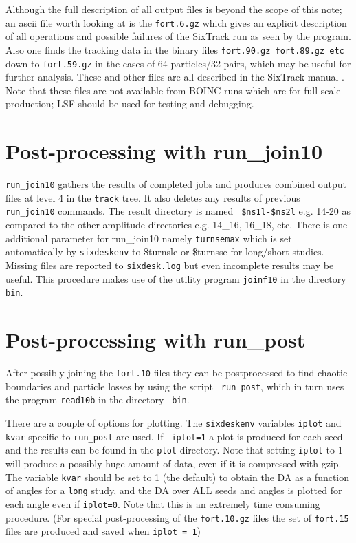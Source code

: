 \documentclass{cernatsnote}
\begin{document}
Although the full description of all output files is beyond the scope of this
note; an ascii file worth looking at is the {\tt fort.6.gz} which gives an
explicit description of all operations and possible failures of the SixTrack
run as seen by the program. Also one finds the tracking data in the binary
files {\tt fort.90.gz fort.89.gz etc} down to {\tt fort.59.gz} in the cases of
64 particles/32 pairs, which may be useful for further analysis. These and
other files are all described in the SixTrack manual \cite{SixTrack}. Note that
these files are not available from BOINC runs which are for full scale
production; LSF should be used for testing and debugging. 

\section{Post-processing with run\_join10}
{\tt run\_join10} gathers the results of completed jobs and produces combined
output files at level 4 in the {\tt track} tree.  It also deletes any results
of previous {\tt run\_join10} commands.  The result directory is named {\tt
\$ns1l-\$ns2l} e.g. 14-20 as compared to the
other amplitude directories e.g. 14\_16, 16\_18, etc.
There is one additional parameter for run\_join10 namely {\tt turnsemax} which
is set automatically by {\tt sixdeskenv} to \$turnsle or \$turnsse for
long/short studies. Missing files are reported to {\tt sixdesk.log} but even
incomplete results may be useful. This procedure makes use of the utility
program {\tt joinf10} in the directory {\tt bin}.

\section{Post-processing with run\_post}
%
\label{sec:run_post}
After possibly joining the {\tt fort.10} files they can be postprocessed to
find chaotic boundaries and particle losses by using the script {\tt
run\_post}, which in turn uses the program {\tt read10b} in the directory {\tt
bin}.

There are a couple of options for plotting.  The  {\tt sixdeskenv} variables
{\tt iplot} and {\tt kvar} specific to {\tt run\_post} are used.  If {\tt
iplot=1} a plot is produced for each seed and the results can be found in the
{\tt plot} directory. Note that setting {\tt iplot} to 1 will produce a
possibly huge amount of data, even if it is compressed with gzip.  The variable
{\tt kvar} should be set to 1 (the default) to obtain the DA as a function of
angles for a {\tt long} study, and the DA over ALL seeds and angles is plotted
for each angle even if {\tt iplot=0}. Note that this is an extremely time
consuming procedure. (For special post-processing of the {\tt fort.10.gz} files
the set of {\tt fort.15} files are produced and saved when {\tt iplot = 1})
\end{document}
